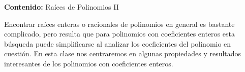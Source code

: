 {\Large\textbf{Contenido:} Raíces de Polinomios II}

Encontrar raíces enteras o racionales de polinomios en general es bastante complicado, pero resulta que para polinomios con
coeficientes enteros esta búsqueda puede simplificarse al analizar los coeficientes del polinomio en cuestión.
En esta  clase nos centraremos en algunas propiedades y resultados interesantes de los polinomios con coeficientes enteros.